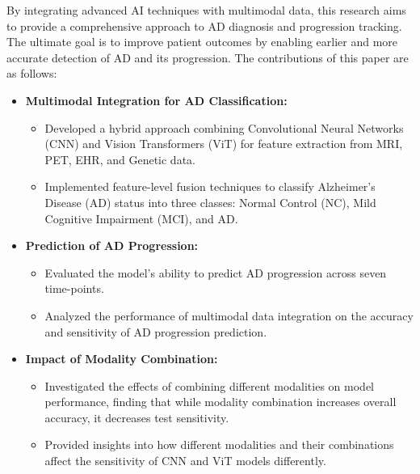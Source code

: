 By integrating advanced AI techniques with multimodal data, this research aims to provide a comprehensive approach to AD diagnosis and progression tracking. The ultimate goal is to improve patient outcomes by enabling earlier and more accurate detection of AD and its progression. The contributions of this paper are as follows:
\begin{itemize}
    \item \textbf{Multimodal Integration for AD Classification:}
    \begin{itemize}
        \item Developed a hybrid approach combining Convolutional Neural Networks (CNN) and Vision Transformers (ViT) for feature extraction from MRI, PET, EHR, and Genetic data.
        \item Implemented feature-level fusion techniques to classify Alzheimer's Disease (AD) status into three classes: Normal Control (NC), Mild Cognitive Impairment (MCI), and AD.
    \end{itemize}
    \item \textbf{Prediction of AD Progression:}
    \begin{itemize}
        \item Evaluated the model's ability to predict AD progression across seven time-points.
        \item Analyzed the performance of multimodal data integration on the accuracy and sensitivity of AD progression prediction.
    \end{itemize}
    
    \item \textbf{Impact of Modality Combination:}
    \begin{itemize}
        \item Investigated the effects of combining different modalities on model performance, finding that while modality combination increases overall accuracy, it decreases test sensitivity.
        \item Provided insights into how different modalities and their combinations affect the sensitivity of CNN and ViT models differently.
    \end{itemize}
 
\end{itemize}

 